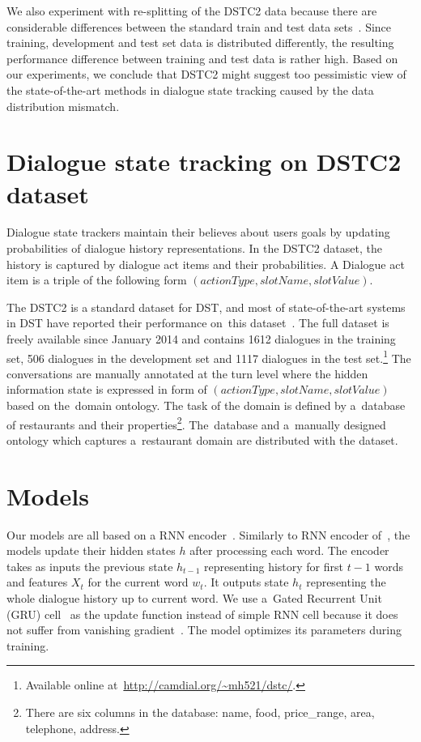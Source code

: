 \documentclass{itatnew}
\begin{document}
We also experiment with re-splitting of the DSTC2 data because there are considerable differences between the standard train and test data sets~\cite{henderson2014second}.
Since training, development and test set data is distributed differently, the resulting performance difference between training and test data is rather high.
Based on our experiments, we conclude that DSTC2 might suggest too pessimistic view of the state-of-the-art methods in dialogue state tracking caused by the data distribution mismatch.


\section{Dialogue state tracking on DSTC2 dataset}\label{sec:dst}
Dialogue state trackers maintain their believes about users goals by updating probabilities of dialogue history representations.
In the DSTC2 dataset, the history is captured by dialogue act items and their probabilities.
A Dialogue act item is a triple of the following form $(actionType, slotName, slotValue)$.

The DSTC2 is a standard dataset for DST, and most of state-of-the-art systems in DST have reported their performance on~this dataset~\cite{henderson2014second}. 
The full dataset is freely available since January 2014 and contains 1612 dialogues in the training set, 506 dialogues in the development set and 1117 dialogues in the test set.\footnote{Available online at~\url{http://camdial.org/~mh521/dstc/}.}
The conversations are manually annotated at the turn level where the hidden information state is expressed in form of $(actionType, slotName, slotValue)$ based on the~domain ontology.
The task of the domain is defined by a~database of restaurants and their properties\footnote{There are six columns in the database: name, food, price\_range, area, telephone, address.}.
The~database and a~manually designed ontology which captures a~restaurant domain are distributed with the dataset.

\section{Models}\label{sec:model}
Our models are all based on a RNN encoder~\cite{werbos1990backpropagation}. 
Similarly to RNN encoder of~\cite{zilka2015incremental}, the models update their hidden states $h$ after processing each word. 
The encoder takes as inputs the previous state $h_{t-1}$ representing history for first $t-1$ words and features $X_t$ for the current word $w_t$. 
It outputs state $h_t$ representing the whole dialogue history up to current word.
We use a~Gated Recurrent Unit (GRU) cell~\cite{cho2014gru} as the update function instead of simple RNN cell because it does not suffer from vanishing gradient~\cite{TODO_vanishing_gradient}.
The model optimizes its parameters during training.
\end{document}
